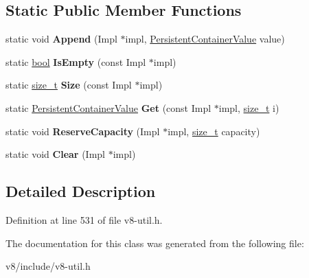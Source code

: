 \subsection*{Static Public Member Functions}
\begin{DoxyCompactItemize}
\item 
\mbox{\label{classv8_1_1DefaultPersistentValueVectorTraits_ac3088f4b37e68ca9ed668a859f89cf21}} 
static void {\bfseries Append} (Impl $\ast$impl, \mbox{\hyperlink{classuintptr__t}{Persistent\+Container\+Value}} value)
\item 
\mbox{\label{classv8_1_1DefaultPersistentValueVectorTraits_a5b410d98817c143d2a3bf0e9dac34bd0}} 
static \mbox{\hyperlink{classbool}{bool}} {\bfseries Is\+Empty} (const Impl $\ast$impl)
\item 
\mbox{\label{classv8_1_1DefaultPersistentValueVectorTraits_a49748bb910ea3482c078c1a8e566bd44}} 
static \mbox{\hyperlink{classsize__t}{size\+\_\+t}} {\bfseries Size} (const Impl $\ast$impl)
\item 
\mbox{\label{classv8_1_1DefaultPersistentValueVectorTraits_ab9787aa7b041a30714cd17258c886cd7}} 
static \mbox{\hyperlink{classuintptr__t}{Persistent\+Container\+Value}} {\bfseries Get} (const Impl $\ast$impl, \mbox{\hyperlink{classsize__t}{size\+\_\+t}} i)
\item 
\mbox{\label{classv8_1_1DefaultPersistentValueVectorTraits_afda15875d9691152b30549e4dbe4eb95}} 
static void {\bfseries Reserve\+Capacity} (Impl $\ast$impl, \mbox{\hyperlink{classsize__t}{size\+\_\+t}} capacity)
\item 
\mbox{\label{classv8_1_1DefaultPersistentValueVectorTraits_ab15a15e95f274defd3362536ae502361}} 
static void {\bfseries Clear} (Impl $\ast$impl)
\end{DoxyCompactItemize}


\subsection{Detailed Description}


Definition at line 531 of file v8-\/util.\+h.



The documentation for this class was generated from the following file\+:\begin{DoxyCompactItemize}
\item 
v8/include/v8-\/util.\+h\end{DoxyCompactItemize}
